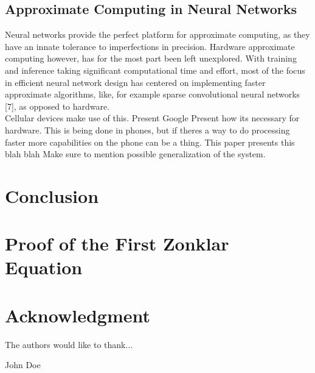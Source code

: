 \documentclass[conference]{IEEEtran}
\begin{document}

\subsection{Approximate Computing in Neural Networks}
	Neural networks provide the perfect platform for approximate computing, as they have an innate tolerance to imperfections in precision. Hardware approximate computing however, has for the most part been left unexplored. With training and inference taking significant computational time and effort, most of the focus in efficient neural network design has centered on implementing faster approximate algorithms, like, for example sparse convolutional neural networks [7], as opposed to hardware.\\
	\indent Cellular devices make use of this. Present Google  
	Present how its necessary for hardware. This is being done in phones, but if theres a way to do processing faster more capabilities on the phone can be a thing.
	This paper presents this blah blah 
	Make sure to mention possible generalization of the system. 
\section{Conclusion}
\blindtext

\appendices
\section{Proof of the First Zonklar Equation}
\blindtext

\section*{Acknowledgment}


The authors would like to thank...

\ifCLASSOPTIONcaptionsoff
  \newpage
\fi


\begin{IEEEbiography}{John Doe}
\blindtext
\end{IEEEbiography}
\end{document}
